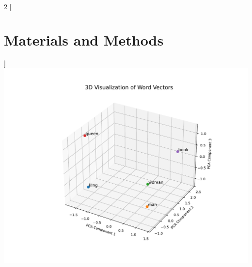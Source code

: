 \begin{multicols}{2}
    [
        \section{Materials and Methods}
    ]
    \includegraphics[trim=2cm 2cm 1cm 3cm, clip, width=\columnwidth]{figures/word_vector_example.pdf}
    \blindtext
    \blindtext
\end{multicols}